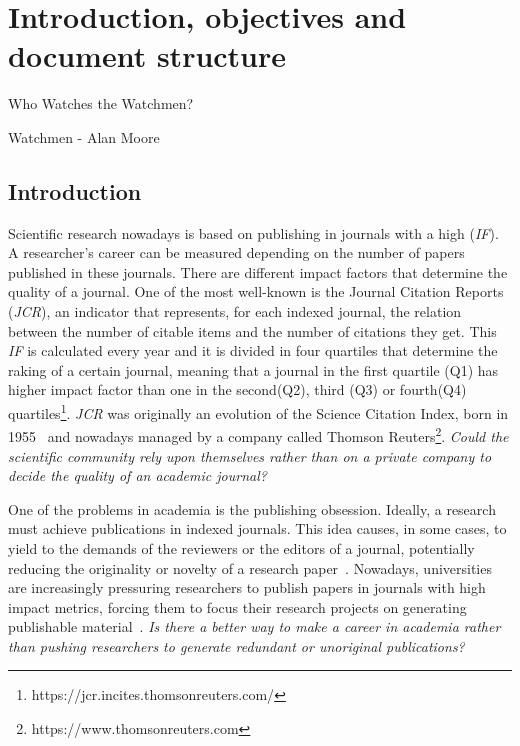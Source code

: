 
\chapter{Introduction, objectives and document structure}
\label{intro}
\begin{FraseCelebre}
  \begin{Frase}
    Who Watches the Watchmen?
  \end{Frase}
  \begin{Fuente}
    Watchmen - Alan Moore
  \end{Fuente}
\end{FraseCelebre}

\section{Introduction}

Scientific research nowadays is based on publishing in journals with a high
 (\emph{IF})\cite{doi:10.1001/jama.295.1.90}. A researcher's
career can be measured depending on the number of papers published in these
journals. There are different impact factors that determine the quality of a
journal. One of the most well-known is the Journal Citation Reports
(\emph{JCR}), an indicator that represents, for each indexed journal, the
relation between the number of citable items and the number of citations they
get. This \emph{IF} is calculated every year and it is divided in four quartiles
that determine the raking of a certain journal, meaning that a journal in the
first quartile (Q1) has higher impact factor than one in the second(Q2), third
(Q3) or fourth(Q4) quartiles\footnote{https://jcr.incites.thomsonreuters.com/}.
\emph{JCR} was originally an evolution of the Science Citation Index, born in
1955~\cite{garfield2007evolution} and nowadays managed by a company called
Thomson Reuters\footnote{https://www.thomsonreuters.com}. \emph{ Could the
  scientific community rely upon themselves rather than on a private company to
  decide the quality of an academic journal?}

One of the problems in academia is the publishing obsession. Ideally, a research
must achieve publications in indexed journals. This idea causes, in some cases,
to yield to the demands of the reviewers or the editors of a journal,
potentially reducing the originality or novelty of a research
paper~\cite{Frey2003}. Nowadays, universities are increasingly pressuring
researchers to publish papers in journals with high impact metrics, forcing them
to focus their research projects on generating publishable
material~\cite{ortinau2011writing}. \emph{ Is there a better way to make a
  career in academia rather than pushing researchers to generate redundant or
  unoriginal publications?}

